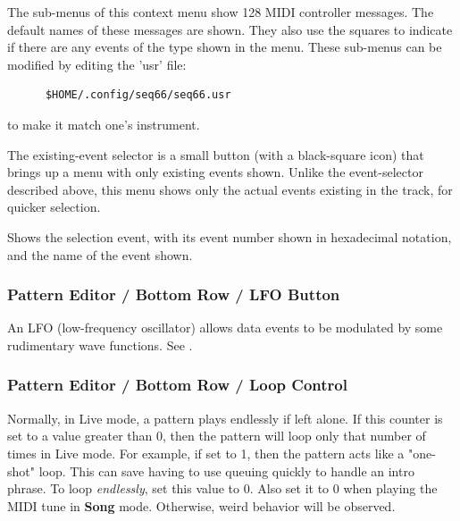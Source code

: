    The sub-menus of this context menu show 128 MIDI controller messages.
   The default names of these messages are shown.
   They also use the squares to
   indicate if there are any events of the type shown in the menu.
   These sub-menus can be modified by editing the 'usr' file:
   
   \begin{verbatim}
      $HOME/.config/seq66/seq66.usr
   \end{verbatim}

   to make it match one's instrument.

   The existing-event selector is a small button (with a black-square icon)
   that brings up a menu with only existing events shown.
   Unlike the event-selector described above, this menu
   shows only the actual events existing in the track, for quicker selection.

   Shows the selection event, with its event number shown in hexadecimal
   notation, and the name of the event shown.

\subsubsection{Pattern Editor / Bottom Row / LFO Button}
\label{subsubsec:pattern_editor_bottom_lfo_button}

   \setcounter{ItemCounter}{0}      %

   An LFO (low-frequency oscillator) allows data events
   to be modulated by some rudimentary wave functions.
   See .

\subsubsection{Pattern Editor / Bottom Row / Loop Control}
\label{subsubsec:pattern_editor_bottom_loop_control}

   \setcounter{ItemCounter}{0}      %

   Normally, in Live mode, a pattern plays endlessly if left alone.
   If this counter is set to a value greater than 0, then the pattern will loop
   only that number of times in Live mode.  For example, if set to 1, then the
   pattern acts like a "one-shot" loop.  This can save having to use
   queuing quickly to handle an intro phrase.
   To loop \textsl{endlessly}, set this value to 0.
   Also set it to 0 when playing the MIDI tune in \textbf{Song} mode.
   Otherwise, weird behavior will be observed.

